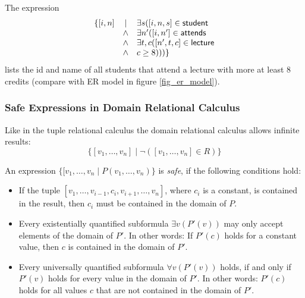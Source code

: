 \begin{example}
The expression
\[ \begin{array}{rcl} \{
[i,n] & \mid & \exists s ([i,n,s] \in \mathsf{student} \\
& \wedge & \exists n' ([i,n'] \in \mathsf{attends} \\
& \wedge & \exists t,c ([n',t,c] \in \mathsf{lecture} \\
& \wedge & c \geq 8 ))) \}
\end{array} \]
lists the id and name of all students that attend a lecture with more at least $8$ credits (compare with ER model in figure \ref{fig_er_model}).
\end{example}




\subsubsection[Safe Expressions in DRC]{Safe Expressions in Domain Relational Calculus}

Like in the tuple relational calculus the domain relational calculus allows infinite results:
\[
\{ [v_1,\ldots,v_n] \mid \neg([v_1,\ldots,v_n] \in R) \}
\]

An expression $\{[v_1,\ldots,v_n\mid P(v_1,\ldots,v_n)\}$ is \emph{safe}, if the following conditions hold:
\begin{itemize}
\item If the tuple $[v_1,\ldots,v_{i-1},c_i,v_{i+1},\ldots,v_n]$, where $c_i$ is a constant, is contained in the result, then $c_i$ must be contained in the domain of $P$.
\item Every existentially quantified subformula $\exists v(P'(v))$ may only accept elements of the domain of $P'$. In other words: If $P'(c)$ holds for a constant value, then $c$ is contained in the domain of $P'$.
\item Every universally quantified subformula $\forall v(P'(v))$ holds, if and only if $P'(v)$ holds for every value in the domain of $P'$. In other words: $P'(c)$ holds for all values $c$ that are not contained in the domain of $P'$.
\end{itemize}




